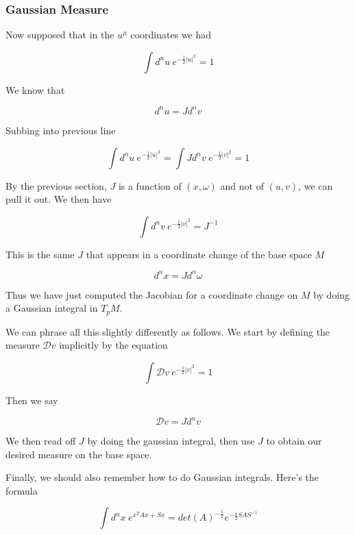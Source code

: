 \subsubsection{Gaussian Measure}

    Now supposed that in the $u^\mu$ coordinates we had

    \begin{equation}
        \int d^n u ~ e^{-\frac12 |u|^2} = 1
    \end{equation}

    We know that

    \begin{equation}
        d^n u = J d^n v
    \end{equation}

    Subbing into previous line

    \begin{equation}
        \int d^n u ~ e^{-\frac12 |u|^2} = \int J d^n v ~ e^{-\frac12 |v|^2} = 1
    \end{equation}

    By the previous section, $J$ is a function of $(x, \omega)$ and not of $(u, v)$, we can pull it out. We then have

    \begin{equation}
        \int d^n v ~ e^{-\frac12 |v|^2} = J^{-1}
    \end{equation}

    This is the same $J$ that appears in a coordinate change of the base space $M$

    \begin{equation}
        d^n x = J d^n \omega
    \end{equation}

    Thus we have just computed the Jacobian for a coordinate change on $M$ by doing a Gaussian integral in $T_p M$.

    We can phrase all this slightly differently as follows. We start by defining the measure $\mathcal D v$ implicitly by the equation

    \begin{equation}
        \int \mathcal D v ~ e^{-\frac12 |v|^2} = 1
    \end{equation}

    Then we say

    \begin{equation}
        \mathcal D v = J d^n v
    \end{equation}

    We then read off $J$ by doing the gaussian integral, then use $J$ to obtain our desired measure on the base space.

    Finally, we should also remember how to do Gaussian integrals. Here's the formula

    \begin{equation}
        \int d^n x ~ e^{x^T A x + Sx} = det(A)^{-\frac12} e^{ - \frac12 S A S^{-1}}
    \end{equation}

